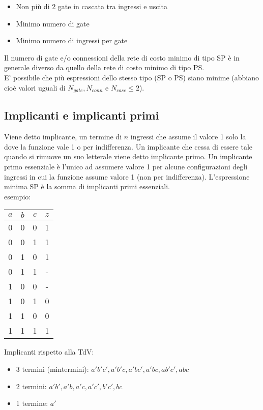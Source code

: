 \documentclass{article}
\begin{document}
\begin{itemize}
    \item Non più di 2 gate in cascata tra ingressi e uscita
    \item Minimo numero di gate
    \item Minimo numero di ingressi per gate
\end{itemize}

\noindent
Il numero di gate e/o connessioni della rete di costo minimo di tipo SP è in generale diverso da quello della rete di costo minimo di tipo PS.\\

\noindent
E' possibile che più espressioni dello stesso tipo (SP o PS) siano minime (abbiano cioè valori uguali di $N_{gate}, N_{conn}$ e $N_{casc} \leq 2$).

\subsection{Implicanti e implicanti primi}

Viene detto implicante, un termine di $n$ ingressi che assume il valore 1 solo la dove la funzione vale 1 o per indifferenza.
Un implicante che cessa di essere tale quando si rimuove un suo letterale viene detto implicante primo.
Un implicante primo essenziale è l'unico ad assumere valore 1 per alcune configurazioni degli ingressi in cui la funzione assume valore 1 (non per indifferenza).
L'espressione minima SP è la somma di implicanti primi essenziali.\\

\noindent
esempio:

\begin{center}
\begin{tabular}{ |c|c|c|c| }
\hline
$a$ & $b$ & $c$ & $z$ \\
\hline
\hline
0 & 0 & 0 & 1 \\
0 & 0 & 1 & 1 \\
0 & 1 & 0 & 1 \\
0 & 1 & 1 & - \\
1 & 0 & 0 & - \\
1 & 0 & 1 & 0 \\
1 & 1 & 0 & 0 \\
1 & 1 & 1 & 1 \\
\hline
\end{tabular}
\end{center}

\noindent
Implicanti rispetto alla TdV:

\begin{itemize}
    \item 3 termini (mintermini): $a'b'c', a'b'c, a'bc', a'bc, ab'c', abc$
    \item 2 termini: $a'b', a'b, a'c, a'c', b'c', bc$
    \item 1 termine: $a'$
\end{itemize}
\end{document}
